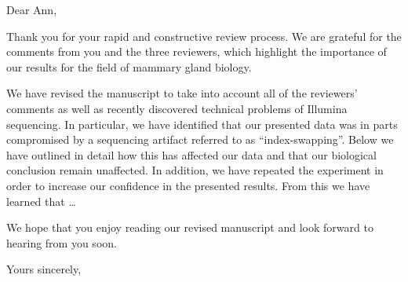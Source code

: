 \documentclass{letter}
\begin{document}
\signature{Karsten Bach and Walid Khaled}
\begin{letter}{}
    \opening{Dear Ann,}

Thank you for your rapid and constructive review process. We are grateful for the comments from you and the three reviewers, which highlight the importance of our results for the field of mammary gland biology.

We have revised the manuscript to take into account all of the reviewers' comments as well as recently discovered technical problems of Illumina sequencing.
In particular, we have identified that our presented data was in parts compromised by a sequencing artifact referred to as ``index-swapping''.
Below we have outlined in detail how this has affected our data and that our biological conclusion remain unaffected.
In addition, we have repeated the experiment in order to increase our confidence in the presented results.
From this we have learned that \ldots

We hope that you enjoy reading our revised manuscript and look forward to hearing from you soon.
    \closing{Yours sincerely,}

\end{letter}
\end{document}
